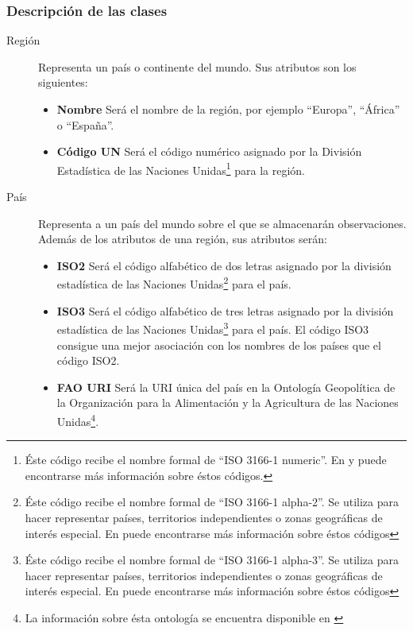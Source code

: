 \subsubsection{Descripción de las clases}
\begin{description}
\item[Región]	Representa un país o continente del mundo.  Sus atributos son los siguientes:
							\begin{itemize}
								\item \textbf{Nombre}  Será el nombre de la región, por ejemplo ``Europa'', ``África'' o ``España''.
								\item \textbf{Código UN}  Será el código numérico asignado por la División Estadística de las Naciones Unidas\footnote{Éste código recibe el nombre formal de ``ISO 3166-1 numeric''.  En \cite{un:standard-country-codes} y \cite{un:iso-3166-country-codes} puede encontrarse más información sobre éstos códigos.} para la región.
							\end{itemize}
\item[País]  Representa a un país del mundo sobre el que se almacenarán observaciones.  Además de los atributos de una región, sus atributos serán:
							\begin{itemize}
							\item \textbf{ISO2}  Será el código alfabético de dos letras asignado por la división estadística de las Naciones Unidas\footnote{Éste código recibe el nombre formal de ``ISO 3166-1 alpha-2''. Se utiliza para hacer representar países, territorios independientes o zonas geográficas de interés especial. En \cite{un:iso-3166-country-codes} puede encontrarse más información sobre éstos códigos} para el país.
							\item \textbf{ISO3}  Será el código alfabético de tres letras asignado por la división estadística de las Naciones Unidas\footnote{Éste código recibe el nombre formal de ``ISO 3166-1 alpha-3''. Se utiliza para hacer representar países, territorios independientes o zonas geográficas de interés especial. En \cite{un:iso-3166-country-codes} puede encontrarse más información sobre éstos códigos} para el país.  El código ISO3 consigue una mejor asociación con los nombres de los países que el código ISO2.
							\item \textbf{FAO URI}  Será la URI única del país en la Ontología Geopolítica de la Organización para la Alimentación y la Agricultura de las Naciones Unidas\footnote{La información sobre ésta ontología se encuentra disponible en \cite{fao:geopolitical-ontology}}.

\end{itemize}
\end{description}
